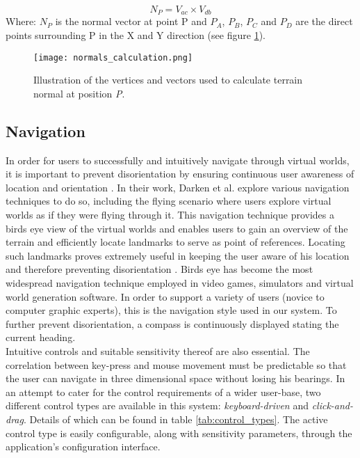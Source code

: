 \begin{equation} \label{eq:normals_calculation}
N_{P} = V_{ac} \times V_{db}
\end{equation}
Where: $N_{P}$ is the normal vector at point P and $P_{A}$, $P_{B}$, $P_{C}$ and $P_{D}$ are the direct points surrounding P in the X and Y direction (see figure \ref{fig:normals_calculation}).

\begin{figure}[h]
\center
	\texttt{[image: normals\_calculation.png]}
	\caption{Illustration of the vertices and vectors used to calculate terrain normal at position \textit{P}.}
	\label{fig:normals_calculation}
\end{figure}

\subsection{Navigation}

In order for users to successfully and intuitively navigate through virtual worlds, it is important to prevent disorientation by ensuring continuous user awareness of location and orientation \cite{Darken1993}. 
In their work, Darken et al. \cite{Darken1993} explore various navigation techniques to do so, including the flying scenario where users explore virtual worlds as if they were flying through it. This navigation technique provides a birds eye view of the virtual worlds and enables users to gain an overview of the terrain and efficiently locate landmarks to serve as point of references. Locating such landmarks proves extremely useful in keeping the user aware of his location and therefore preventing disorientation \cite{Darken1993}. Birds eye has become the most widespread navigation technique employed in video games, simulators and virtual world generation software. In order to support a variety of users (novice to computer graphic experts), this is the navigation style used in our system. To further prevent disorientation, a compass is continuously displayed stating the current heading. \\

Intuitive controls and suitable sensitivity thereof are also essential. The correlation between key-press and mouse movement must be predictable so that the user can navigate in three dimensional space without losing his bearings. In an attempt to cater for the control requirements of a wider user-base, two different control types are available in this system: \textit{keyboard-driven} and \textit{click-and-drag}. Details of which can be found in table \ref{tab:control_types}. The active control type is easily configurable, along with sensitivity parameters, through the application's configuration interface.

